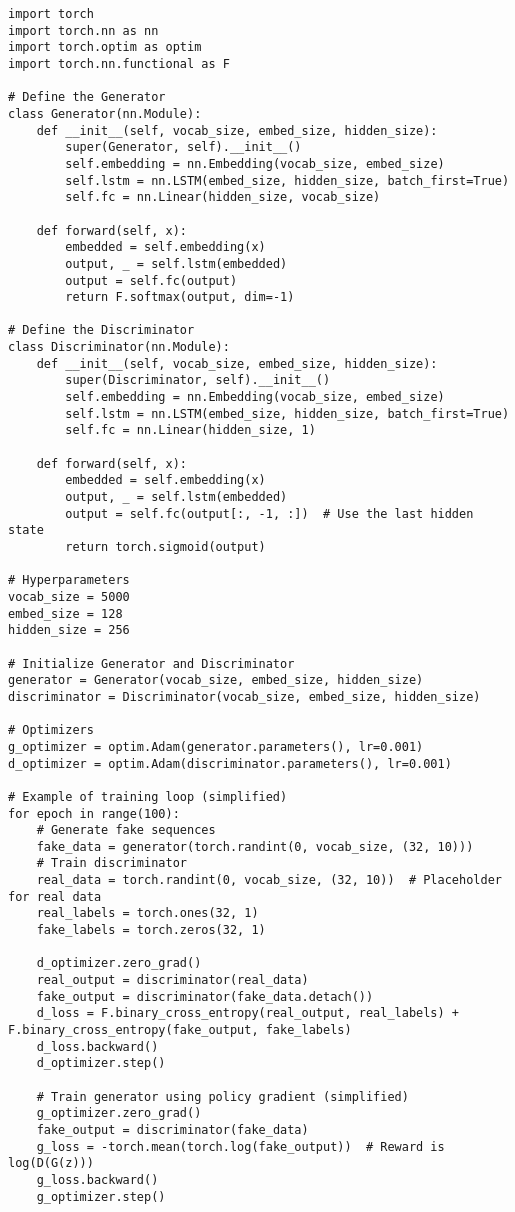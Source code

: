 \begin{lstlisting}[style=python]
import torch
import torch.nn as nn
import torch.optim as optim
import torch.nn.functional as F

# Define the Generator
class Generator(nn.Module):
    def __init__(self, vocab_size, embed_size, hidden_size):
        super(Generator, self).__init__()
        self.embedding = nn.Embedding(vocab_size, embed_size)
        self.lstm = nn.LSTM(embed_size, hidden_size, batch_first=True)
        self.fc = nn.Linear(hidden_size, vocab_size)
    
    def forward(self, x):
        embedded = self.embedding(x)
        output, _ = self.lstm(embedded)
        output = self.fc(output)
        return F.softmax(output, dim=-1)

# Define the Discriminator
class Discriminator(nn.Module):
    def __init__(self, vocab_size, embed_size, hidden_size):
        super(Discriminator, self).__init__()
        self.embedding = nn.Embedding(vocab_size, embed_size)
        self.lstm = nn.LSTM(embed_size, hidden_size, batch_first=True)
        self.fc = nn.Linear(hidden_size, 1)
    
    def forward(self, x):
        embedded = self.embedding(x)
        output, _ = self.lstm(embedded)
        output = self.fc(output[:, -1, :])  # Use the last hidden state
        return torch.sigmoid(output)

# Hyperparameters
vocab_size = 5000
embed_size = 128
hidden_size = 256

# Initialize Generator and Discriminator
generator = Generator(vocab_size, embed_size, hidden_size)
discriminator = Discriminator(vocab_size, embed_size, hidden_size)

# Optimizers
g_optimizer = optim.Adam(generator.parameters(), lr=0.001)
d_optimizer = optim.Adam(discriminator.parameters(), lr=0.001)

# Example of training loop (simplified)
for epoch in range(100):
    # Generate fake sequences
    fake_data = generator(torch.randint(0, vocab_size, (32, 10)))
    # Train discriminator
    real_data = torch.randint(0, vocab_size, (32, 10))  # Placeholder for real data
    real_labels = torch.ones(32, 1)
    fake_labels = torch.zeros(32, 1)
    
    d_optimizer.zero_grad()
    real_output = discriminator(real_data)
    fake_output = discriminator(fake_data.detach())
    d_loss = F.binary_cross_entropy(real_output, real_labels) + F.binary_cross_entropy(fake_output, fake_labels)
    d_loss.backward()
    d_optimizer.step()
    
    # Train generator using policy gradient (simplified)
    g_optimizer.zero_grad()
    fake_output = discriminator(fake_data)
    g_loss = -torch.mean(torch.log(fake_output))  # Reward is log(D(G(z)))
    g_loss.backward()
    g_optimizer.step()
\end{lstlisting}


